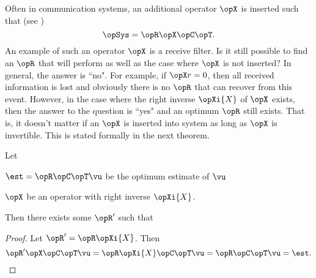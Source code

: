 Often in communication systems, an additional  operator $\opX$ is
inserted such that (see )
   \[ \opSys = \opR\opX\opC\opT.\]
An example of such an operator $\opX$ is a receive filter.
Is it still possible to find an $\opR$ that will perform as well as
the case where $\opX$ is not inserted?
In general, the answer is ``no".
For example, if $\opX r=0$, then all received information is lost
and obviously there is no $\opR$ that can recover from this event.
However, in the case where the right inverse $\opXi{X}$ of $\opX$ exists,
then the answer to the question is ``yes" and an optimum  $\opR$
still exists.
That is, it doesn't matter if an $\opX$ is inserted into system
as long as $\opX$ is invertible.
This is stated formally in the next theorem.
\begin{theorem} 
\label{thm:reversibility}
Let
\begin{liste}
   \item $\est = \opR\opC\opT\vu$ be the optimum estimate of $\vu$
   \item $\opX$ be an operator with right inverse $\opXi{X}$.
\end{liste}
Then there exists some $\opR'$ such that
\end{theorem}
\begin{proof}
  Let $\opR'=\opR\opXi{X}$.
  Then
  \[ \opR'\opX\opC\opT\vu = \opR\opXi{X}\opC\opT\vu = \opR\opC\opT\vu = \est. \]
\end{proof}


